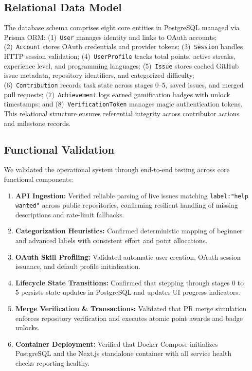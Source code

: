 \documentclass[conference]{IEEEtran}
\begin{document}
\subsection{Relational Data Model}
The database schema comprises eight core entities in PostgreSQL managed via Prisma ORM: (1)~\texttt{User} manages identity and links to OAuth accounts; (2)~\texttt{Account} stores OAuth credentials and provider tokens; (3)~\texttt{Session} handles HTTP session validation; (4)~\texttt{UserProfile} tracks total points, active streaks, experience level, and programming languages; (5)~\texttt{Issue} stores cached GitHub issue metadata, repository identifiers, and categorized difficulty; (6)~\texttt{Contribution} records task state across stages 0--5, saved issues, and merged pull requests; (7)~\texttt{Achievement} logs earned gamification badges with unlock timestamps; and (8)~\texttt{VerificationToken} manages magic authentication tokens. This relational structure ensures referential integrity across contributor actions and milestone records.

\subsection{Functional Validation}
We validated the operational system through end-to-end testing across core functional components:
\begin{enumerate}
    \item \textbf{API Ingestion:} Verified reliable parsing of live issues matching \texttt{label:"help wanted"} across public repositories, confirming resilient handling of missing descriptions and rate-limit fallbacks.
    \item \textbf{Categorization Heuristics:} Confirmed deterministic mapping of beginner and advanced labels with consistent effort and point allocations.
    \item \textbf{OAuth Skill Profiling:} Validated automatic user creation, OAuth session issuance, and default profile initialization.
    \item \textbf{Lifecycle State Transitions:} Confirmed that stepping through stages 0 to 5 persists state updates in PostgreSQL and updates UI progress indicators.
    \item \textbf{Merge Verification \& Transactions:} Validated that PR merge simulation enforces repository verification and executes atomic point awards and badge unlocks.
    \item \textbf{Container Deployment:} Verified that Docker Compose initializes PostgreSQL and the Next.js standalone container with all service health checks reporting healthy.
\end{enumerate}
\end{document}
